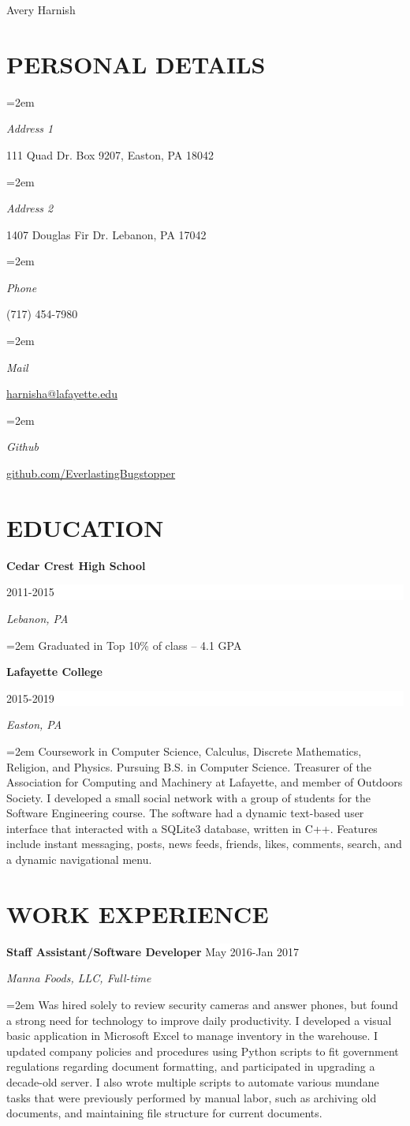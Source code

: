 \documentclass[paper=letter,fontsize=11pt]{scrartcl} %
\newlength{\spacebox}
\newcommand{\sepspace}{\vspace*{1em}}		%
\newcommand{\MyName}[1]{ %
		\Huge \usefont{OT1}{phv}{b}{n} \hfill #1
		\par \normalsize \normalfont}
\newcommand{\NewPart}[1]{\section*{\uppercase{#1}}}
\newcommand{\PersonalEntry}[2]{
		\noindent\hangindent=2em\hangafter=0 %
		\parbox{\spacebox}{        %
		\textit{#1}}		       %
		\hspace{1.5em} #2 \par}    %
\newcommand{\EducationEntry}[4]{
		\noindent \textbf{#1} \hfill      %
		\colorbox{White}{%
			\parbox{6em}{%
			\hfill\color{Black}#2}} \par  %
		\noindent \textit{#3} \par        %
		\noindent\hangindent=2em\hangafter=0 \small #4 %
		\normalsize \par}
\newcommand{\WorkEntry}[4]{				  %
		\noindent \textbf{#1} \hfill      %
		\colorbox{White}{\color{Black}#2} \par  %
		\noindent \textit{#3} \par              %
		\noindent\hangindent=2em\hangafter=0 \small #4 %
		\normalsize \par}
\begin{document}

\MyName{Avery Harnish}


\NewPart{Personal details}{}

\PersonalEntry{Address 1}{111 Quad Dr. Box 9207, Easton, PA 18042}
\PersonalEntry{Address 2}{1407 Douglas Fir Dr. Lebanon, PA 17042}
\PersonalEntry{Phone}{(717) 454-7980}
\PersonalEntry{Mail}{\url{harnisha@lafayette.edu}}
\PersonalEntry{Github}{\url{github.com/EverlastingBugstopper}}

\NewPart{Education}{}

\EducationEntry{Cedar Crest High School}{2011-2015}{Lebanon, PA}{Graduated in Top 10\% of class -- 4.1 GPA}
\sepspace

\EducationEntry{Lafayette College}{2015-2019}{Easton, PA}{Coursework in Computer Science, Calculus, Discrete Mathematics, Religion, and Physics. Pursuing B.S. in Computer Science. Treasurer of the Association for Computing and Machinery at Lafayette, and member of Outdoors Society. I developed a small social network with a group of students for the Software Engineering course. The software had a dynamic text-based user interface that interacted with a SQLite3 database, written in C++. Features include instant messaging, posts, news feeds, friends, likes, comments, search, and a dynamic navigational menu.}

\NewPart{Work experience}{}

\WorkEntry{Staff Assistant/Software Developer}{May 2016-Jan 2017}{Manna Foods, LLC, Full-time}{Was hired solely to review security cameras and answer phones, but found a strong need for technology to improve daily productivity. I developed a visual basic application in Microsoft Excel to manage inventory in the warehouse. I updated company policies and procedures using Python scripts to fit government regulations regarding document formatting, and participated in upgrading a decade-old server. I also wrote multiple scripts to automate various mundane tasks that were previously performed by manual labor, such as archiving old documents, and maintaining file structure for current documents.}
\sepspace
\end{document}
